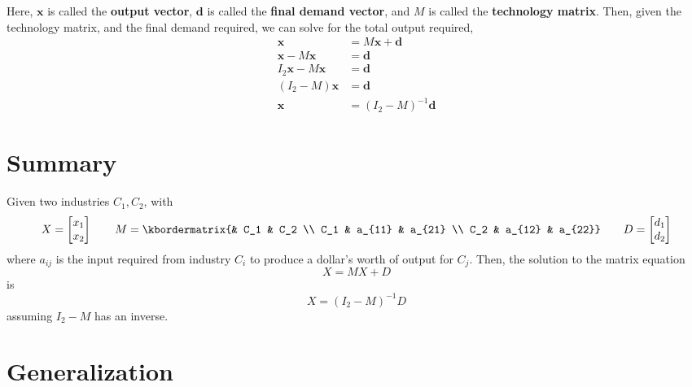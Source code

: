 \documentclass[letterpaper,12pt]{article}
\theoremstyle{definition}
\renewcommand{\vec}[1]{\mathbf{#1}}
\begin{document}
Here, $\vec{x}$ is called the \textbf{output vector}, $\vec{d}$ is called the \textbf{final demand vector}, and $M$ is called the \textbf{technology matrix}. Then, given the technology matrix, and the final demand required, we can solve for the total output required,
\begin{align*}
    \vec{x} & = M\vec{x} + \vec{d} \\
    \vec{x} - M\vec{x} & = \vec{d} \\
    I_2 \vec{x} - M\vec{x} & = \vec{d} \\
    (I_2 - M)\vec{x} & = \vec{d} \\
    \vec{x} & = (I_2 - M)^{-1} \vec{d}
\end{align*}

\section*{Summary}
Given two industries $C_1, C_2$, with
\begin{equation*}
    X = \begin{bmatrix} x_1 \\ x_2 \end{bmatrix} \qquad M = \kbordermatrix{& C_1 & C_2 \\ C_1 & a_{11} & a_{21} \\ C_2 & a_{12} & a_{22}} \qquad D = \begin{bmatrix} d_1 \\ d_2 \end{bmatrix}
\end{equation*}
where $a_{ij}$ is the input required from industry $C_i$ to produce a dollar's worth of output for $C_j$. Then, the solution to the matrix equation
\begin{equation*}
    X = MX + D
\end{equation*}
is
\begin{equation*}
    \boxed{X = (I_2 - M)^{-1} D}
\end{equation*}
assuming $I_2 - M$ has an inverse.

\section*{Generalization}
\end{document}
